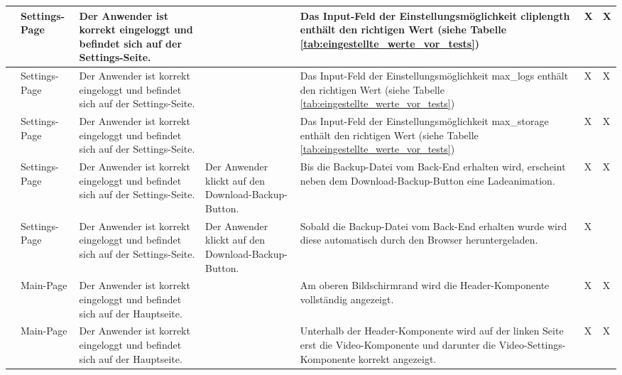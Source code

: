 \begin{longtable}{| p{} | p{} | p{} | p{} | p{} | p{} | p{} |}
	\stepcounter{TestNumber}\arabic{TestNumber} & Settings-Page & Der Anwender ist korrekt eingeloggt und befindet sich auf der Settings-Seite. & & Das Input-Feld der Einstellungsmöglichkeit cliplength enthält den richtigen Wert (siehe Tabelle \ref{tab:eingestellte_werte_vor_tests}) & X & X \\ \hline
	
	\stepcounter{TestNumber}\arabic{TestNumber} & Settings-Page & Der Anwender ist korrekt eingeloggt und befindet sich auf der Settings-Seite. & & Das Input-Feld der Einstellungsmöglichkeit max\_logs enthält den richtigen Wert (siehe Tabelle \ref{tab:eingestellte_werte_vor_tests}) & X & X \\ \hline
	
	\stepcounter{TestNumber}\arabic{TestNumber} & Settings-Page & Der Anwender ist korrekt eingeloggt und befindet sich auf der Settings-Seite. & & Das Input-Feld der Einstellungsmöglichkeit max\_storage enthält den richtigen Wert (siehe Tabelle \ref{tab:eingestellte_werte_vor_tests}) & X & X \\ \hline
	
	\stepcounter{TestNumber}\arabic{TestNumber} & Settings-Page & Der Anwender ist korrekt eingeloggt und befindet sich auf der Settings-Seite. & Der Anwender klickt auf den Download-Backup-Button. & Bis die Backup-Datei vom Back-End erhalten wird, erscheint neben dem Download-Backup-Button eine Ladeanimation. & X & X \\ \hline
	
	\stepcounter{TestNumber}\arabic{TestNumber} & Settings-Page & Der Anwender ist korrekt eingeloggt und befindet sich auf der Settings-Seite. & Der Anwender klickt auf den Download-Backup-Button. & Sobald die Backup-Datei vom Back-End erhalten wurde wird diese automatisch durch den Browser heruntergeladen. & X &  \\ \hline
	
	\stepcounter{TestNumber}\arabic{TestNumber} & Main-Page & Der Anwender ist korrekt eingeloggt und befindet sich auf der Hauptseite. & & Am oberen Bildschirmrand wird die Header-Komponente vollständig angezeigt. & X & X \\ \hline
	
	\stepcounter{TestNumber}\arabic{TestNumber} & Main-Page & Der Anwender ist korrekt eingeloggt und befindet sich auf der Hauptseite. & & Unterhalb der Header-Komponente wird auf der linken Seite erst die Video-Komponente und darunter die Video-Settings-Komponente korrekt angezeigt. & X & X \\ \hline
	

\end{longtable}
